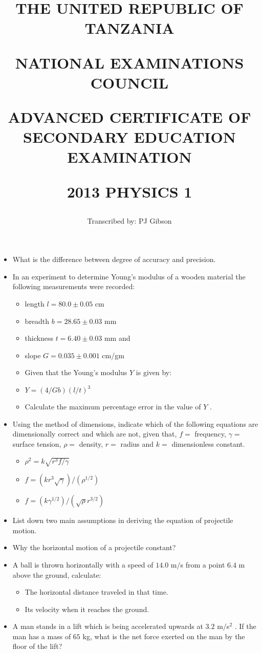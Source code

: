 \documentclass{article}
\title{THE UNITED REPUBLIC OF TANZANIA

NATIONAL EXAMINATIONS COUNCIL

ADVANCED CERTIFICATE OF SECONDARY EDUCATION EXAMINATION

\textbf{2013 PHYSICS 1}}
\author{Transcribed by:  PJ Gibson}
\begin{document}
\maketitle

\begin{itemize}
\item What is the difference between degree of accuracy and precision.
\item In an experiment to determine Young's modulus of a wooden material the following measurements were recorded:
 \begin{itemize}
\item length $ l=80.0\pm 0.05$ cm 
\item breadth $ b=28.65\pm 0.03$ mm
\item thickness $ t=6.40\pm 0.03$ mm and
\item slope $ G=0.035\pm 0.001$ cm/gm
\item Given that the Young’s modulus $ Y$ is given by:
\item $ Y=(4/Gb)(l/t)^{3}$
\item Calculate the maximum percentage error in the value of $ Y$ .
\end{itemize}
\item Using the method of dimensions, indicate which of the following equations are dimensionally correct and which are not, given that, $ f=$ frequency, $ \gamma =$ surface tension, $ \rho =$ density, $ r=$ radius and $ k=$ dimensionless constant.
 \begin{itemize}
\item  $ \rho^{2}=k\sqrt{r^{3}f/\gamma }$
\item  $ f=(kr^{3}\sqrt{\gamma })/(\rho^{1/2})$
\item  $ f=(k\gamma^{1/2})/(\sqrt{\rho}r^{3/2})$
\end{itemize}
\item List down two main assumptions in deriving the equation of projectile motion.
\item Why the horizontal motion of a projectile constant? 
\item A ball is thrown horizontally with a speed of $ 14.0$ m$/$s from a point $ 6.4$ m above the ground, calculate:
 \begin{itemize}
\item The horizontal distance traveled in that time.
\item Its velocity when it reaches the ground.
\end{itemize}
\item A man stands in a lift which is being accelerated upwards at $ 3.2$ m$/$s$ ^{2}$ . If the man has a mass of $ 65$ kg, what is the net force exerted on the man by the floor of the lift?

\end{itemize}
\end{document}
